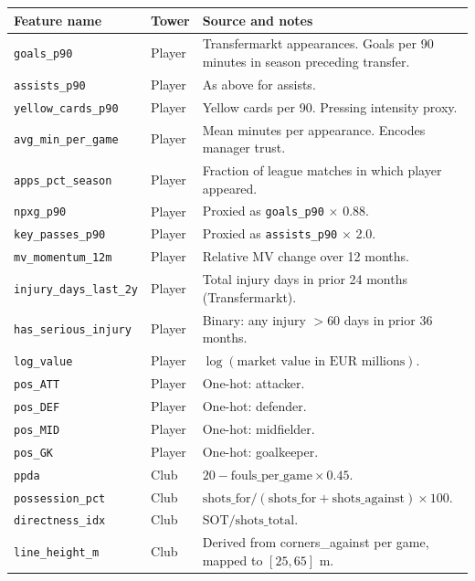 \documentclass[12pt, a4paper, oneside]{report}
\begin{document}
\begin{longtable}{p{3.5cm} p{2cm} p{7.5cm}}
\toprule
\textbf{Feature name} & \textbf{Tower} & \textbf{Source and notes} \\
\midrule
\texttt{goals\_p90}          & Player & Transfermarkt appearances. Goals per 90 minutes in season preceding transfer. \\
\texttt{assists\_p90}        & Player & As above for assists. \\
\texttt{yellow\_cards\_p90}  & Player & Yellow cards per 90. Pressing intensity proxy. \\
\texttt{avg\_min\_per\_game} & Player & Mean minutes per appearance. Encodes manager trust. \\
\texttt{apps\_pct\_season}   & Player & Fraction of league matches in which player appeared. \\
\texttt{npxg\_p90}           & Player & Proxied as \texttt{goals\_p90} $\times$ 0.88. \\
\texttt{key\_passes\_p90}    & Player & Proxied as \texttt{assists\_p90} $\times$ 2.0. \\
\texttt{mv\_momentum\_12m}   & Player & Relative MV change over 12 months. \\
\texttt{injury\_days\_last\_2y} & Player & Total injury days in prior 24 months (Transfermarkt). \\
\texttt{has\_serious\_injury}& Player & Binary: any injury $> 60$ days in prior 36 months. \\
\texttt{log\_value}          & Player & $\log(\text{market value in EUR millions})$. \\
\texttt{pos\_ATT}            & Player & One-hot: attacker. \\
\texttt{pos\_DEF}            & Player & One-hot: defender. \\
\texttt{pos\_MID}            & Player & One-hot: midfielder. \\
\texttt{pos\_GK}             & Player & One-hot: goalkeeper. \\
\midrule
\texttt{ppda}                & Club & $20 - \text{fouls\_per\_game} \times 0.45$. \\
\texttt{possession\_pct}     & Club & $\text{shots\_for} / (\text{shots\_for} + \text{shots\_against}) \times 100$. \\
\texttt{directness\_idx}     & Club & $\text{SOT} / \text{shots\_total}$. \\
\texttt{line\_height\_m}     & Club & Derived from corners\_against per game, mapped to $[25, 65]$ m. \\

\end{longtable}
\end{document}
